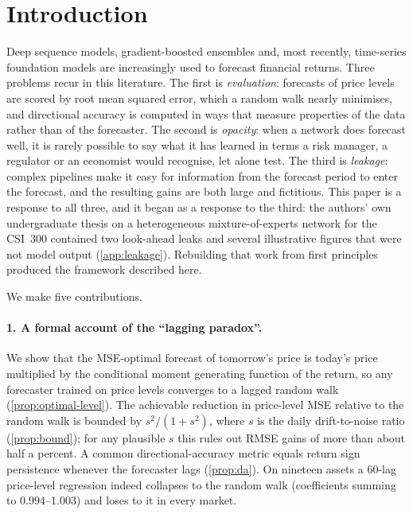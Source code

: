 \section{Introduction}\label{sec:intro}

Deep sequence models, gradient-boosted ensembles and, most recently, time-series foundation models are
increasingly used to forecast financial returns. Three problems recur in this literature. The first is
\emph{evaluation}: forecasts of price levels are scored by root mean squared error, which a random walk
nearly minimises, and directional accuracy is computed in ways that measure properties of the data
rather than of the forecaster. The second is \emph{opacity}: when a network does forecast well, it is
rarely possible to say what it has learned in terms a risk manager, a regulator or an economist would
recognise, let alone test. The third is \emph{leakage}: complex pipelines make it easy for information
from the forecast period to enter the forecast, and the resulting gains are both large and fictitious.
This paper is a response to all three, and it began as a response to the third: the authors'
own undergraduate thesis on a heterogeneous mixture-of-experts network for the CSI~300 contained two
look-ahead leaks and several illustrative figures that were not model output (\cref{app:leakage}).
Rebuilding that work from first principles produced the framework described here.

We make five contributions.

\paragraph{1. A formal account of the ``lagging paradox''.}
We show that the MSE-optimal forecast of tomorrow's price is today's price multiplied by the
conditional moment generating function of the return, so any forecaster trained on price levels
converges to a lagged random walk (\cref{prop:optimal-level}). The achievable reduction in price-level
MSE relative to the random walk is bounded by $s^2/(1+s^2)$, where $s$ is the daily
drift-to-noise ratio (\cref{prop:bound}); for any plausible $s$ this rules out RMSE gains of more than
about half a percent. A common directional-accuracy metric equals return sign persistence whenever the
forecaster lags (\cref{prop:da}). On nineteen assets a 60-lag price-level regression indeed collapses
to the random walk (coefficients summing to $0.994$--$1.003$) and loses to it in every market.

